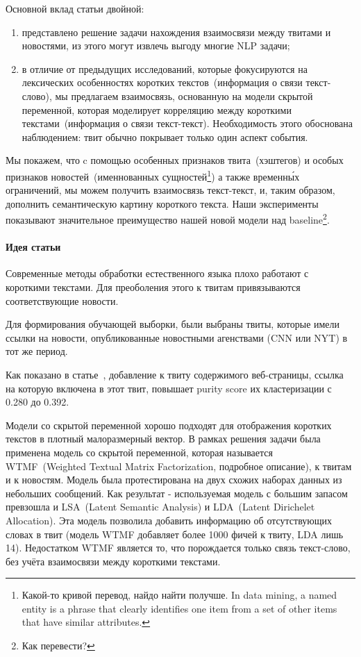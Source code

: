             Основной вклад статьи двойной:
            \begin{enumerate}
                \item представлено решение задачи нахождения взаимосвязи между твитами и новостями, из этого могут извлечь выгоду многие NLP задачи;
                \item в отличие от предыдущих исследований, которые фокусируются на лексических особенностях коротких текстов~(информация о связи текст-слово), мы предлагаем взаимосвязь, основанную на модели скрытой переменной, которая моделирует корреляцию между короткими текстами~(информация о связи текст-текст). Необходимость этого обоснована наблюдением: твит обычно покрывает только один аспект события.
            \end{enumerate}

            Мы покажем, что c помощью особенных признаков твита~(хэштегов) и особых признаков новостей~(именнованных сущностей\footnote{Какой-то кривой перевод, найдо найти получше. In data mining, a named entity is a phrase that clearly identifies one item from a set of other items that have similar attributes.}) а также временн\'{ы}х ограничений, мы можем получить взаимосвязь текст-текст, и, таким образом, дополнить семантическую картину короткого текста.
            Наши эксперименты показывают значительное преимущество нашей новой модели над baseline\footnote{Как перевести?}.

        \paragraph{Идея статьи}
            Современные методы обработки естественного языка плохо работают с короткими текстами. Для преоболения этого к твитам привязываются соответствующие новости.

            Для формирования обучающей выборки, были выбраны твиты, которые имели ссылки на новости, опубликованные новостными агенствами (CNN или NYT) в тот же период.

            Как показано в статье~\cite{long_to_short}, добавление к твиту содержимого веб-страницы, ссылка на которую включена в этот твит, повышает {\color{red} purity score} их кластеризации с 0.280 до 0.392.

            Модели со скрытой переменной хорошо подходят для отображения коротких текстов в плотный малоразмерный вектор.
            В рамках решения задачи была применена модель со скрытой переменной, которая называется WTMF~(Weighted Textual Matrix Factorization, подробное описание\cite{wtmf}), к твитам и к новостям. Модель была протестирована на двух схожих наборах данных из небольших сообщений. Как результат - используемая модель с большим запасом превзошла и LSA~(Latent Semantic Analysis) и LDA~(Latent Dirichelet Allocation). Эта модель позволила добавить информацию об отсутствующих словах в твит (модель WTMF добавляет более 1000 фичей к твиту, LDA лишь 14). Недостатком WTMF является то, что порождается только связь текст-слово, без учёта взаимосвязи между короткими текстами.


